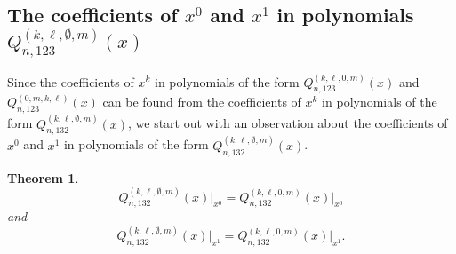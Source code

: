 \documentclass[
final,nomarks
]{dmtcs-episciences}
\newtheorem{theorem}{Theorem}
\newcommand{\Qmmn}[2]{Q_{#2,132}^{(#1)}(x)}
\newcommand{\Qmn}[2]{Q_{#2,123}^{(#1)}(x)}
\begin{document}
\subsection{The coefficients of \(x^0\) and \(x^1\) in polynomials \(\Qmn{k,\ell,\emptyset,m}{n}\)}

Since the coefficients of \begin{math}x^k\end{math}  in polynomials of the form 
\begin{math}\Qmn{k,\ell,0,m}{n}\end{math} and \begin{math}\Qmn{0,m,k,\ell}{n}\end{math} can be found from the 
coefficients of \begin{math}x^k\end{math} 
in polynomials of the form \begin{math}\Qmmn{k,\ell,\emptyset,m}{n}\end{math}, we start out 
with an observation about the coefficients of \begin{math}x^0\end{math} and \begin{math}x^1\end{math} in polynomials of the 
form \begin{math}\Qmmn{k,\ell,\emptyset,m}{n}\end{math}.
\begin{theorem}\label{theorem:3}
	\begin{equation}\label{eq3.1}
	\Qmmn{k,\ell,\emptyset,m}{n}\big\vert_{x^0}=\Qmmn{k,\ell,0,m}{n}\big\vert_{x^0}
	\end{equation}
	and
	\begin{equation}\label{eq3.2}
	\Qmmn{k,\ell,\emptyset,m}{n}\big\vert_{x^1}=\Qmmn{k,\ell,0,m}{n}\big\vert_{x^1}.
	\end{equation}
\end{theorem}
\end{document}

